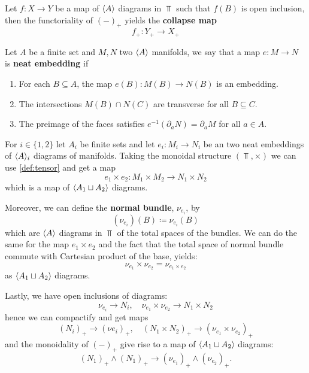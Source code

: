 \begin{defn}\label{def:CollapaseMap}
Let $f:X \to Y$ be a map of $\langle A \rangle$ diagrams in $\Top$ such that $f(B)$ is open inclusion, then the functoriality of $(-)_+$ yields the \textbf{collapse map}
\begin{equation*}
    f_+: Y_+ \to X_+
\end{equation*}
\end{defn}



\begin{defn}
Let $A$ be a finite set and $M,N$ two $\langle A \rangle$ manifolds, we say that a map $e:M \to N$ is \textbf{neat embedding} if
\begin{enumerate}
    \item For each $B \subseteq A$, the map $e(B)\colon M(B) \to N(B)$ is an embedding.
    \item The intersections $M(B) \cap N(C)$ are transverse for all $B \subseteq C$.
    \item The preimage of the faces satisfies $e^{-1}(\partial_a N) = \partial_a M$ for all $a \in A$.
\end{enumerate}
\end{defn}

For $i \in \{1,2\}$ let $A_i$ be finite sets and let $e_i:M_i \to N_i$ be an two neat embeddings of $\langle A \rangle_i$ diagrams of manifolds. Taking the monoidal structure $(\Top,\times)$ we can use \cref{def:tensor} and get a map
\begin{equation*}
    e_1 \times e_2 \colon M_1 \times M_2 \to N_1 \times N_2
\end{equation*}
which is a map of $\langle A_1 \sqcup A_2 \rangle$ diagrams.

Moreover, we can define the \textbf{normal bundle}, $\nu_{e_i}$, by
\begin{equation*}
    (\nu_{e_i} )(B) \coloneqq \nu_{e_i}(B)
\end{equation*}
which are $\langle A \rangle$ diagrams in $\Top$ of the total spaces of the bundles. We can do the same for the map $e_1 \times e_2$ and the fact that the total space of normal bundle commute with Cartesian product of the base, yields:
\begin{equation*}
    \nu_{e_1} \times \nu_{e_2} = \nu_{e_1 \times e_2}
\end{equation*}
as $\langle A_1 \sqcup A_2 \rangle$ diagrams.

Lastly, we have open inclusions of diagrams:
\begin{equation*}
    \nu_{e_i} \to N_i, \quad  \nu_{e_1} \times \nu_{e_2} \to N_1 \times N_2
\end{equation*}
hence we can compactify and get maps
\begin{equation*}
    (N_i)_+ \to (\nu e_i)_+, \quad (N_1 \times N_2)_+ \to (\nu_{e_1} \times \nu_{e_2})_+
\end{equation*}
and the monoidality of $(-)_+$ give rise to a map of $\langle A_1 \sqcup A_2 \rangle$ diagrams:
\begin{equation*}
    (N_1)_+ \wedge (N_1)_+ \to (\nu_{e_1})_+ \wedge (\nu_{e_2})_+.
\end{equation*}


